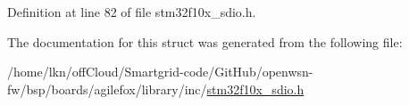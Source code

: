 Definition at line 82 of file stm32f10x\+\_\+sdio.\+h.



The documentation for this struct was generated from the following file\+:\begin{DoxyCompactItemize}
\item 
/home/lkn/off\+Cloud/\+Smartgrid-\/code/\+Git\+Hub/openwsn-\/fw/bsp/boards/agilefox/library/inc/\hyperlink{agilefox_2library_2inc_2stm32f10x__sdio_8h}{stm32f10x\+\_\+sdio.\+h}\end{DoxyCompactItemize}
